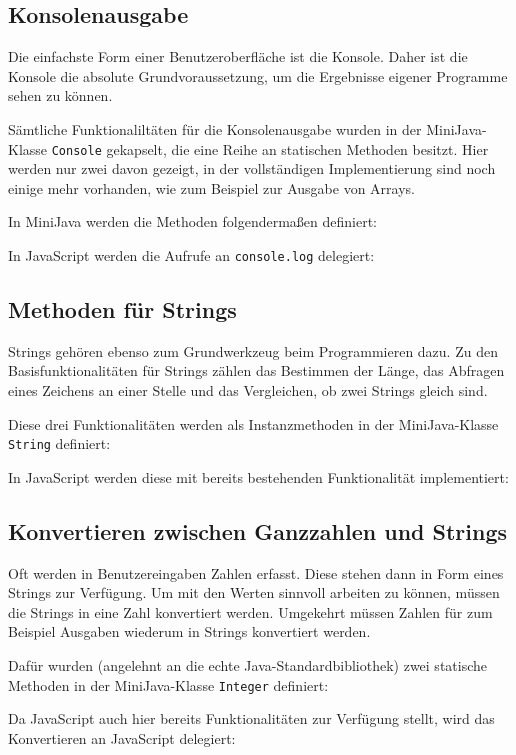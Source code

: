 \subsection{Konsolenausgabe}
Die einfachste Form einer Benutzeroberfläche ist die Konsole. Daher ist die Konsole die absolute Grundvoraussetzung, um die Ergebnisse eigener Programme sehen zu können.

Sämtliche Funktionaliltäten für die Konsolenausgabe wurden in der MiniJava-Klasse \lstinline{Console} gekapselt, die eine Reihe an statischen Methoden besitzt. Hier werden nur zwei davon gezeigt, in der vollständigen Implementierung sind noch einige mehr vorhanden, wie zum Beispiel zur Ausgabe von Arrays.

In MiniJava werden die Methoden folgendermaßen definiert:


In JavaScript werden die Aufrufe an \lstinline{console.log} delegiert:


\subsection{Methoden für Strings}

Strings gehören ebenso zum Grundwerkzeug beim Programmieren dazu. Zu den Basisfunktionalitäten für Strings zählen das Bestimmen der Länge, das Abfragen eines Zeichens an einer Stelle und das Vergleichen, ob zwei Strings gleich sind.

Diese drei Funktionalitäten werden als Instanzmethoden in der MiniJava-Klasse \lstinline{String} definiert:


In JavaScript werden diese mit bereits bestehenden Funktionalität implementiert:


\subsection{Konvertieren zwischen Ganzzahlen und Strings}

Oft werden in Benutzereingaben Zahlen erfasst. Diese stehen dann in Form eines Strings zur Verfügung. Um mit den Werten sinnvoll arbeiten zu können, müssen die Strings in eine Zahl konvertiert werden. Umgekehrt müssen Zahlen für zum Beispiel Ausgaben wiederum in Strings konvertiert werden.

Dafür wurden (angelehnt an die echte Java-Standardbibliothek) zwei statische Methoden in der MiniJava-Klasse \lstinline{Integer} definiert:


Da JavaScript auch hier bereits Funktionalitäten zur Verfügung stellt, wird das Konvertieren an JavaScript delegiert:

